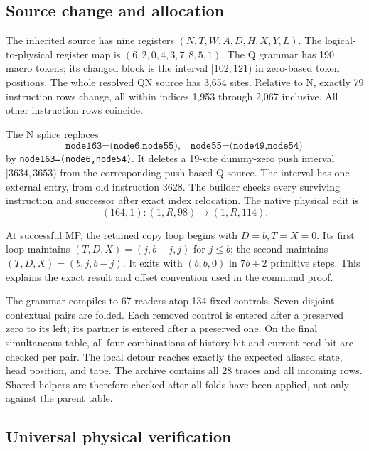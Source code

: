 \documentclass[11pt,letterpaper]{article}
\begin{document}
\subsection{Source change and allocation}

The inherited source has nine registers $(N,T,W,A,D,H,X,Y,L)$. The
logical-to-physical register map is $(6,2,0,4,3,7,8,5,1)$.
The Q grammar has 190 macro tokens; its changed block is the interval
$[102,121)$ in zero-based token positions. The whole resolved QN source
has 3,654 sites. Relative to N, exactly 79 instruction rows change, all within
indices 1,953 through 2,067 inclusive. All other instruction rows coincide.

The N splice replaces
\[
\texttt{node163=(node6,node55)},\quad
\texttt{node55=(node49,node54)}
\]
by \texttt{node163=(node6,node54)}. It deletes a 19-site dummy-zero push
interval $[3634,3653)$ from the corresponding push-based Q source.
The interval has one external entry, from old instruction 3628.
The builder checks every surviving instruction and successor after exact
index relocation. The native physical edit is
\[
(164,1):(1,R,98)\longmapsto(1,R,114).
\]

At successful MP, the retained copy loop begins with $D=b,T=X=0$.
Its first loop maintains $(T,D,X)=(j,b-j,j)$ for $j\le b$;
the second maintains $(T,D,X)=(b,j,b-j)$. It exits with $(b,b,0)$
in $7b+2$ primitive steps. This explains the exact result and offset
convention used in the command proof.

The grammar compiles to 67 readers atop 134 fixed controls.
Seven disjoint contextual pairs are folded. Each removed control is
entered after a preserved zero to its left; its partner is entered after
a preserved one. On the final simultaneous table, all four combinations
of history bit and current read bit are checked per pair. The local
detour reaches exactly the expected aliased state, head position, and tape.
The archive contains all 28 traces and all incoming rows. Shared helpers
are therefore checked after all folds have been applied, not only against
the parent table.

\subsection{Universal physical verification}
\end{document}
